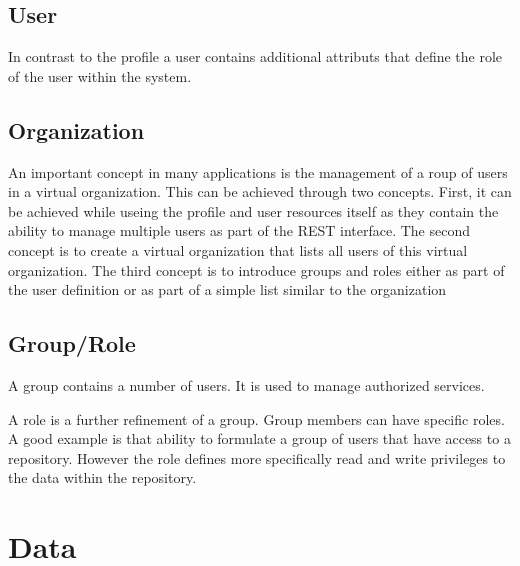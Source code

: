 \documentclass[9pt,twocolumn,twoside]{styles/osajnl}
\begin{document}

\subsection{User}

In contrast to the profile a user contains additional attributs that
define the role of the user within the system.


\subsection{Organization}

An important concept in many applications is the management of a roup
of users in a virtual organization. This can be achieved through two
concepts. First, it can be achieved while useing the profile and user
resources itself as they contain the ability to manage multiple users
as part of the REST interface. The second concept is to create a
virtual organization that lists all users of this virtual
organization. The third concept is to introduce groups and roles
either as part of the user definition or as part of a simple list
similar to the organization



\subsection{Group/Role}

A group contains a number of users. It is used to manage authorized
services.


A role is a further refinement of a group. Group members can have
specific roles. A good example is that ability to formulate a group of
users that have access to a repository. However the role defines more
specifically read and write privileges to the data within the repository.


\section{Data}
\end{document}
